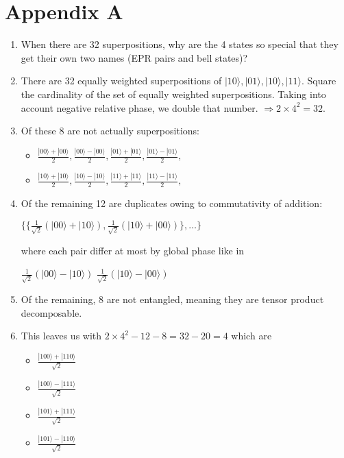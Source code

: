 \documentclass[a4paper,12pt]{amsbook}
\newcommand{\0}{{$|0\rangle$}}
\newcommand{\1}{{$|1\rangle$}}
\begin{document}
\section{Appendix A}
\begin{enumerate}
    \item When there are 32 superpositions, why are the 4 states so special that they get their own two names (EPR pairs and bell states)? 

    \item There are 32 equally weighted superpositions of $|10\rangle, |01\rangle, |10\rangle, |11\rangle.$
Square the cardinality of the set of equally weighted superpositions. Taking into account negative relative phase, we double that number.
    $\Rightarrow 2 \times 4^2 = 32.$ 

    \item Of these 8 are not actually superpositions\footnotemark[5]:

        \begin{itemize}
    \item     $\frac{|00\rangle + |00\rangle}{2},\frac{ |00\rangle - |00\rangle}{2},\frac{ |01\rangle + |01\rangle}{2}, \frac{ |01\rangle - |01\rangle}{2}, $

    \item     $\frac{ |10\rangle + |10\rangle}{2},\frac{ |10\rangle - |10\rangle}{2},\frac{ |11\rangle + |11\rangle}{2},\frac{ |11\rangle - |11\rangle}{2}, $
        \end{itemize}

    \item Of the remaining 12 are duplicates owing to commutativity of addition:

        $\{\{\frac{1}{\sqrt{2}}(|00\rangle + |10\rangle),  \frac{1}{\sqrt{2}}(|10\rangle + |00\rangle)\}, \dots\}$

    where each pair differ at most by global phase like in

    $\frac{1}{\sqrt{2}}(|00\rangle - |10\rangle)$ $\frac{1}{\sqrt{2}}(|10\rangle - |00\rangle)$

    \item Of the remaining, 8 are not entangled, meaning they are tensor product decomposable.

    \item This leaves us with $2\times4^2 - 12 - 8 = 32 - 20 = 4$ which are

        \begin{itemize}
    \item $\frac{|100\rangle + |110\rangle}{\sqrt{2}}$ 
    \item $\frac{|100\rangle - |111\rangle}{\sqrt{2}}$ 
    \item $\frac{|101\rangle + |111\rangle}{\sqrt{2}}$
    \item $\frac{|101\rangle - |110\rangle}{\sqrt{2}}$
\end{itemize}


\end{enumerate}
\end{document}
